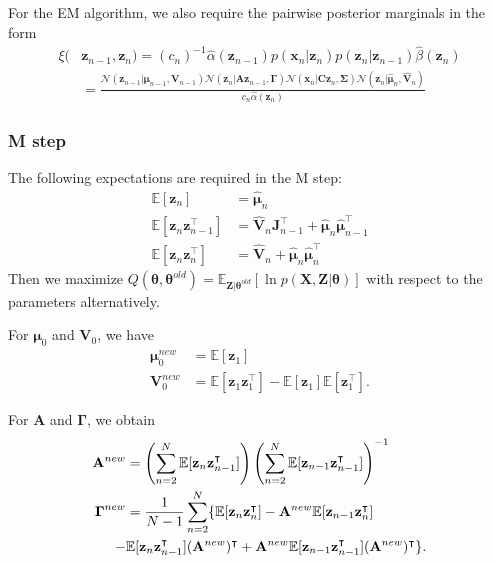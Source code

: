 \documentclass[a4paper]{report}
\renewcommand{\bf}{\mathbf}
\renewcommand{\cal}{\mathcal}
\newcommand{\bb}{\mathbb}
\newcommand{\bs}{\boldsymbol}
\begin{document}
For the EM algorithm, we also require the pairwise posterior marginals in the form
\begin{align}
	\xi(&\bf{z}_{n-1},\bf{z}_n) = (c_n)^{-1}\hat{\alpha}(\bf{z}_{n-1})p(\bf{x}_n|\bf{z}_n)p(\bf{z}_n|\bf{z}_{n-1})\hat{\beta}(\bf{z}_n) \\
	&=\frac{\cal{N}(\bf{z}_{n-1}|\bs{\mu}_{n-1},\bf{V}_{n-1})\cal{N}(\bf{z}_n|\bf{Az}_{n-1},\bs{\Gamma})\cal{N}(\bf{x}_n|\bf{Cz}_n,\bs{\Sigma})\cal{N}(\bf{z}_n|\hat{\bs{\mu}}_n,\hat{\bf{V}}_n)}{c_n\hat{\alpha}(\bf{z}_n)}
\end{align}
\subsubsection{M step}
The following expectations are required in the M step:
\begin{align}
	\bb{E}[\bf{z}_n] &= \hat{\bs{\mu}}_n \\
	\bb{E}[\bf{z}_n\bf{z}_{n-1}^{\intercal}] &= \hat{\bf{V}}_n \bf{J}_{n-1}^{\intercal} +\hat{\bs{\mu}}_n\hat{\bs{\mu}}_{n-1}^{\intercal}\\
	\bb{E}[\bf{z}_n\bf{z}_n^{\intercal}] &= \hat{\bf{V}}_n + \hat{\bs{\mu}}_n \hat{\bs{\mu}}_n^{\intercal}
\end{align}
Then we maximize $Q(\bs{\theta},\bs{\theta}^{old}) = \bb{E}_{\bf{Z}|\bs{\theta}^{old}}[\ln p(\bf{X,Z}|\bs{\theta})]$ with respect to the parameters alternatively.

For $\bs{\mu}_0$ and $\bf{V}_0$, we have
\begin{align}
	\bs{\mu}_0^{new} &= \bb{E}[\bf{z}_1] \\
	\bf{V}_0^{new} &= \bb{E}[\bf{z}_1\bf{z}_1^{\intercal}] - \bb{E}[\bf{z}_1]\bb{E}[\bf{z}_1^{\intercal}].
\end{align}

For $\bf{A}$ and $\bs{\Gamma}$, we obtain
\begin{align}
	\bf{A}^{new} &= \left(\sum_{n=2}^N \bb{E}[\bf{z}_n \bf{z}_{n-1}^{\intercal}]\right)\left( \sum_{n=2}^N \bb{E}[\bf{z}_{n-1}\bf{z}_{n-1}^{\intercal}] \right)^{-1} \\
	\bs{\Gamma}^{new} &= \frac{1}{N-1} \sum_{n=2}^N \{ \bb{E}[\bf{z}_n\bf{z}_n^{\intercal}]-\bf{A}^{new}\bb{E}[\bf{z}_{n-1}\bf{z}_n^{\intercal}] \notag\\
	-&\bb{E}[\bf{z}_n\bf{z}_{n-1}^{\intercal}](\bf{A}^{new})^{\intercal} + \bf{A}^{new} \bb{E}[\bf{z}_{n-1}\bf{z}_{n-1}^{\intercal}] (\bf{A}^{new})^{\intercal}\}.
\end{align}
\end{document}

